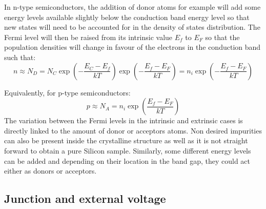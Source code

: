 		In n-type semiconductors, the addition of donor atoms for example will add some energy levels available slightly below the conduction band energy level so that new states will need to be accounted for in the density of states distribution. The Fermi level will then be raised from its intrinsic value $E_f$ to $E_F$ so that the population densities will change in favour of the electrons in the conduction band such that: 
		\begin{equation}
			n \approx N_D = N_C \exp(-\frac{E_C - E_f}{kT})\exp(-\frac{E_f - E_F}{kT}) = n_i \exp(-\frac{E_f - E_F}{kT})
		\end{equation}

		Equivalently, for p-type semiconductors: 
		\begin{equation}
			p \approx N_A = n_i \exp(\frac{E_f- E_F}{kT})
		\end{equation}
		The variation between the Fermi levels in the intrinsic and extrinsic cases is directly linked to the amount of donor or acceptors atoms. 
		Non desired impurities can also be present inside the crystalline structure as well as it is not straight forward to obtain a pure Silicon sample. Similarly, some different energy levels can be added and depending on their location in the band gap, they could act either as donors or acceptors.
		\clearpage
		\subsection{Junction and external voltage}\label{subsec:2.1.2}

